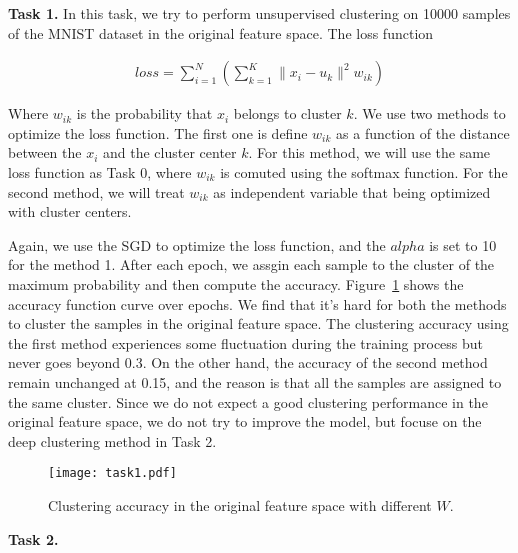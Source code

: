 \documentclass{article}
\begin{document}
\textbf{Task 1.}
\vspace{\baselineskip}
In this task, we try to perform unsupervised clustering on 10000 samples of the MNIST dataset in the original feature space. The loss function

\begin{align*}
  loss = \sum_{i=1}^{N}{\left(\sum_{k=1}^{K}\|x_i-u_k\|^2w_{ik}\right)}
\end{align*}

Where $w_{ik}$ is the probability that $x_i$ belongs to cluster $k$. We use two methods to optimize the loss function. The first one is define $w_{ik}$ as a function of the distance between the $x_i$ and the cluster center $k$. For this method, we will use the same loss function as Task 0, where $w_{ik}$ is comuted using the softmax function. For the second method, we will treat $w_{ik}$ as independent variable that being optimized with cluster centers.

Again, we use the SGD to optimize the loss function, and the $alpha$ is set to 10 for the method 1. After each epoch, we assgin each sample to the cluster of the maximum probability and then compute the accuracy. Figure~\ref{fig:task1} shows the accuracy function curve over epochs. We find that it's hard for both the methods to cluster the samples in the original feature space. The clustering accuracy using the first method experiences some fluctuation during the training process but never goes beyond 0.3. On the other hand, the accuracy of the second method remain unchanged at 0.15, and the reason is that all the samples are assigned to the same cluster. Since we do not expect a good clustering performance in the original feature space, we do not try to improve the model, but focuse on the deep clustering method in Task 2.

\begin{figure}[h!]
  \centering
  \texttt{[image: task1.pdf]}
  \caption{Clustering accuracy in the original feature space with different $W$.}
  \label{fig:task1}
\end{figure}


\textbf{Task 2.}
\end{document}
